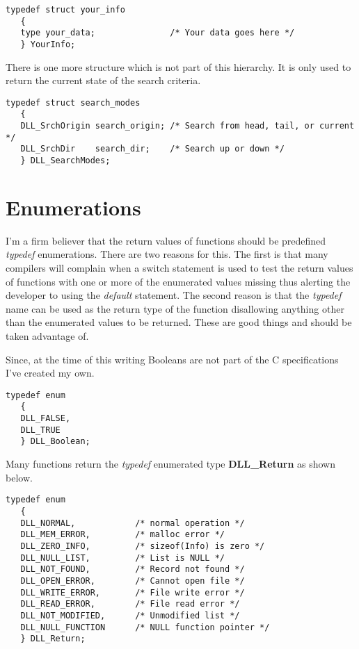 \documentclass[10pt,letterpaper,titlepage]{article}
\begin{document}
\small
\begin{verbatim}
typedef struct your_info
   {
   type your_data;               /* Your data goes here */
   } YourInfo;
\end{verbatim}
\normalsize
\vspace{8pt}

\noindent
There is one more structure which is not part of this hierarchy.  It is only used to return the current state of the search criteria.

\small
\begin{verbatim}
typedef struct search_modes
   {
   DLL_SrchOrigin search_origin; /* Search from head, tail, or current */
   DLL_SrchDir    search_dir;    /* Search up or down */
   } DLL_SearchModes;
\end{verbatim}
\normalsize
\pagebreak

\section{Enumerations}
I'm a firm believer that the return values of functions should be predefined \emph{typedef} enumerations.  There are two reasons for this.  The first is that many compilers will complain when a switch statement is used to test the return values of functions with one or more of the enumerated values missing thus alerting the developer to using the \emph{default} statement.   The second reason is that the \emph{typedef} name can be used as the return type of the function disallowing anything other than the enumerated values to be returned.  These are good things and should be taken advantage of.
\vspace{8pt}

\noindent
Since, at the time of this writing Booleans are not part of the C specifications I've created my own.

\small
\begin{verbatim}
typedef enum
   {
   DLL_FALSE,
   DLL_TRUE
   } DLL_Boolean;
\end{verbatim}
\normalsize
\vspace{8pt}

\noindent
Many functions return the \emph{typedef} enumerated type \textbf{DLL\_Return} as shown below.

\small
\begin{verbatim}
typedef enum
   {
   DLL_NORMAL,            /* normal operation */
   DLL_MEM_ERROR,         /* malloc error */
   DLL_ZERO_INFO,         /* sizeof(Info) is zero */
   DLL_NULL_LIST,         /* List is NULL */
   DLL_NOT_FOUND,         /* Record not found */
   DLL_OPEN_ERROR,        /* Cannot open file */
   DLL_WRITE_ERROR,       /* File write error */
   DLL_READ_ERROR,        /* File read error */
   DLL_NOT_MODIFIED,      /* Unmodified list */
   DLL_NULL_FUNCTION      /* NULL function pointer */
   } DLL_Return;
\end{verbatim}
\normalsize
\vspace{8pt}
\end{document}
